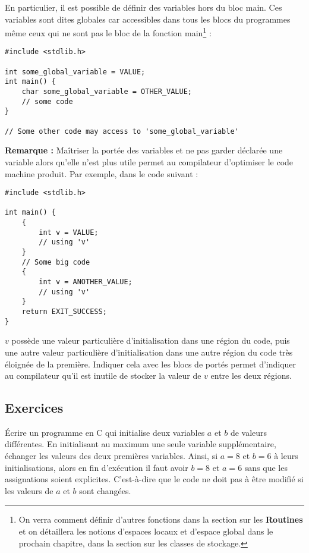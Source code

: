 \documentclass[../../../main.tex]{subfiles}
\begin{document}
En particulier, il est possible de définir des variables hors du bloc \textsf{main}. Ces variables sont dites globales car accessibles dans tous les blocs du programmes même ceux qui ne sont pas le bloc de la fonction \textsf{main}\footnote{On verra comment définir d'autres fonctions dans la section sur les \textbf{Routines} et on détaillera les notions d'espaces locaux et d'espace global dans le prochain chapitre, dans la section sur les classes de stockage.} :
\begin{verbatim}
#include <stdlib.h>

int some_global_variable = VALUE;
int main() {
	char some_global_variable = OTHER_VALUE;
	// some code
}

// Some other code may access to 'some_global_variable'
\end{verbatim}
\textbf{Remarque :} Maîtriser la portée des variables et ne pas garder déclarée une variable alors qu'elle n'est plus utile permet au compilateur d'optimiser le code machine produit. Par exemple, dans le code suivant :
\begin{verbatim}
#include <stdlib.h>

int main() {
	{
		int v = VALUE;
		// using 'v'
	}
	// Some big code
	{
		int v = ANOTHER_VALUE;
		// using 'v'
	}
	return EXIT_SUCCESS;
}
\end{verbatim}
$v$ possède une valeur particulière d'initialisation dans une région du code, puis une autre valeur particulière d'initialisation dans une autre région du code très éloignée de la première. Indiquer cela avec les blocs de portés permet d'indiquer au compilateur qu'il est inutile de stocker la valeur de $v$ entre les deux régions.
\subsection{Exercices}
 Écrire un programme en C qui initialise deux variables $a$ et $b$ de valeurs différentes. En initialisant au maximum une seule variable supplémentaire, échanger les valeurs des deux premières variables. Ainsi, si $a = 8$ et $b = 6$ à leurs initialisations, alors en fin d'exécution il faut avoir $b = 8$ et $a = 6$ sans que les assignations soient explicites. C'est-à-dire que le code ne doit pas à être modifié si les valeurs de $a$ et $b$ sont changées.
\end{document}
